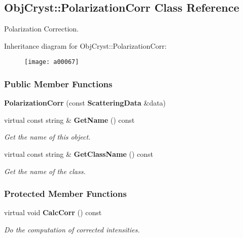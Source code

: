 \subsection{Obj\-Cryst\-:\-:Polarization\-Corr Class Reference}
\label{a00067}


Polarization Correction.  


Inheritance diagram for Obj\-Cryst\-:\-:Polarization\-Corr\-:\begin{figure}[H]
\begin{center}
\leavevmode
\texttt{[image: a00067]}
\end{center}
\end{figure}
\subsubsection*{Public Member Functions}
\begin{DoxyCompactItemize}
\item 
{\bfseries Polarization\-Corr} (const {\bf Scattering\-Data} \&data)\label{a00067_a2a4847d1595188d8023f20c9c9d0d4ce}

\item 
virtual const string \& {\bf Get\-Name} () const \label{a00067_a6bfca1f83186379f77e2ee2ef5e65ac5}

\begin{DoxyCompactList}\small\item\em Get the name of this object. \end{DoxyCompactList}\item 
virtual const string \& {\bf Get\-Class\-Name} () const \label{a00067_ae298bdf956280d610cc18aad4acb1af7}

\begin{DoxyCompactList}\small\item\em Get the name of the class. \end{DoxyCompactList}\end{DoxyCompactItemize}
\subsubsection*{Protected Member Functions}
\begin{DoxyCompactItemize}
\item 
virtual void {\bf Calc\-Corr} () const \label{a00067_a3030bd67935be0434c1cebfd385b82a2}

\begin{DoxyCompactList}\small\item\em Do the computation of corrected intensities. \end{DoxyCompactList}\end{DoxyCompactItemize}
